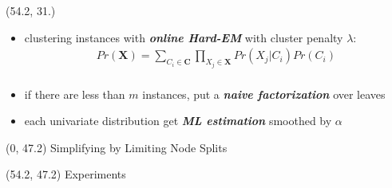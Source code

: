 \documentclass[final]{beamer}
\begin{document}
\begin{frame}{}
\begin{textblock}{25.7}
    
  \end{textblock}
  
  
  \begin{textblock}{25.7}(54.2, 31.)
    \footnotesize
    \begin{itemize}
  \item clustering instances with \textbf{\emph{online Hard-EM}} with cluster penalty
    $\lambda$:
    \[\begin{array}{cc}
        Pr(\mathbf{X})= \sum_{C_i \in \mathbf{C}}\prod_{X_j \in \mathbf{X}}Pr(X_j|C_i)Pr(C_i)\\
      \end{array}\]
    \item if there are less than $m$ instances, put a \textbf{\emph{naive
          factorization}} over leaves
    \item each univariate distribution get \emph{\textbf{ML estimation}} smoothed by $\alpha$  
    \end{itemize}
  \end{textblock}
  
  
  \begin{textblock}{80}(0, 47.2)
    Simplifying by Limiting Node Splits
  \end{textblock}

  \begin{textblock}{20}(54.2, 47.2)
    Experiments
  \end{textblock}
  

\end{frame}
\end{document}
